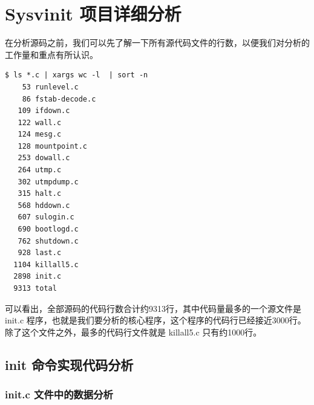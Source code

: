 \chapter{Sysvinit 项目详细分析}

在分析源码之前，我们可以先了解一下所有源代码文件的行数，以便我们对分析的工作量和重点有所认识。

{\begin{shaded}\begin{verbatim}
$ ls *.c | xargs wc -l  | sort -n
    53 runlevel.c
    86 fstab-decode.c
   109 ifdown.c
   122 wall.c
   124 mesg.c
   128 mountpoint.c
   253 dowall.c
   264 utmp.c
   302 utmpdump.c
   315 halt.c
   568 hddown.c
   607 sulogin.c
   690 bootlogd.c
   762 shutdown.c
   928 last.c
  1104 killall5.c
  2898 init.c
  9313 total
\end{verbatim}\end{shaded}}
可以看出，全部源码的代码行数合计约9313行，其中代码量最多的一个源文件是
init.c
程序，也就是我们要分析的核心程序，这个程序的代码行已经接近3000行。除了这个文件之外，最多的代码行文件就是
killall5.c 只有约1000行。

\section{init 命令实现代码分析}

\subsection{init.c 文件中的数据分析}

